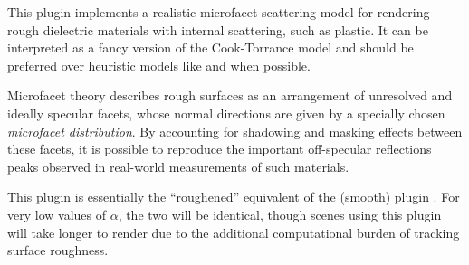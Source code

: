 {    
}

\vspace{3mm}
This plugin implements a realistic microfacet scattering model for rendering
rough dielectric materials with internal scattering, such as plastic. It can
be interpreted as a fancy version of the Cook-Torrance model and should be
preferred over heuristic models like  and 
when possible.

Microfacet theory describes rough surfaces as an arrangement of
unresolved and ideally specular facets, whose normal directions are given by
a specially chosen \emph{microfacet distribution}. By accounting for shadowing
and masking effects between these facets, it is possible to reproduce the important
off-specular reflections peaks observed in real-world measurements of such
materials.


This plugin is essentially the ``roughened'' equivalent of the (smooth) plugin
. For very low values of $\alpha$, the two will
be identical, though scenes using this plugin will take longer to render
due to the additional computational burden of tracking surface roughness.

